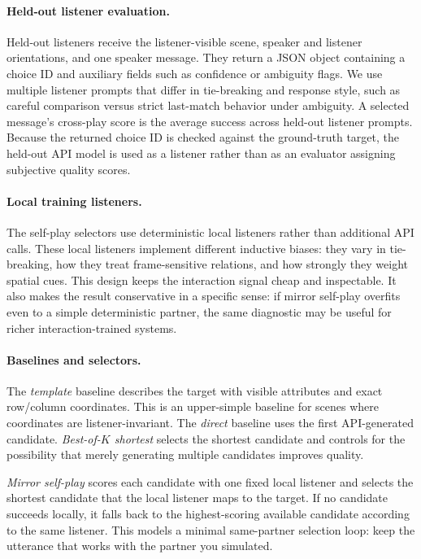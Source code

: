 \paragraph{Held-out listener evaluation.}
Held-out listeners receive the listener-visible scene, speaker and listener orientations, and one speaker message. They return a JSON object containing a choice ID and auxiliary fields such as confidence or ambiguity flags. We use multiple listener prompts that differ in tie-breaking and response style, such as careful comparison versus strict last-match behavior under ambiguity. A selected message's cross-play score is the average success across held-out listener prompts. Because the returned choice ID is checked against the ground-truth target, the held-out API model is used as a listener rather than as an evaluator assigning subjective quality scores.

\paragraph{Local training listeners.}
The self-play selectors use deterministic local listeners rather than additional API calls. These local listeners implement different inductive biases: they vary in tie-breaking, how they treat frame-sensitive relations, and how strongly they weight spatial cues. This design keeps the interaction signal cheap and inspectable. It also makes the result conservative in a specific sense: if mirror self-play overfits even to a simple deterministic partner, the same diagnostic may be useful for richer interaction-trained systems.

\paragraph{Baselines and selectors.}
The \emph{template} baseline describes the target with visible attributes and exact row/column coordinates. This is an upper-simple baseline for scenes where coordinates are listener-invariant. The \emph{direct} baseline uses the first API-generated candidate. \emph{Best-of-$K$ shortest} selects the shortest candidate and controls for the possibility that merely generating multiple candidates improves quality.

\emph{Mirror self-play} scores each candidate with one fixed local listener and selects the shortest candidate that the local listener maps to the target. If no candidate succeeds locally, it falls back to the highest-scoring available candidate according to the same listener. This models a minimal same-partner selection loop: keep the utterance that works with the partner you simulated.

